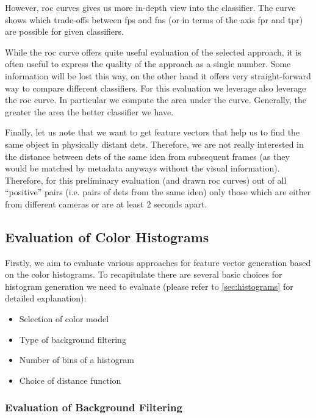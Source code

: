 However, \gls{roc} curves gives us more in-depth view into the classifier.
The curve shows which trade-offs between \glspl{fp} and \glspl{fn} (or in terms
of the axis \gls{fpr} and \gls{tpr}) are possible for given classifiers.

While the \gls{roc} curve offers quite useful evaluation of the
selected approach, it is often useful to express the quality of the
approach as a single number. Some information will be lost this way,
on the other hand it offers very straight-forward way to compare different
classifiers. For this evaluation we leverage also leverage the \gls{roc} curve.
In particular we compute the area under the curve. Generally, the greater
the area the better classifier we have.

Finally, let us note that we want to get feature vectors that help us to find the same object in physically distant \glspl{det}. Therefore, we are not really interested in the distance between \glspl{det} of the same \gls{iden} from subsequent frames (as they would be matched by metadata anyways without the visual information). Therefore, for this preliminary evaluation (and drawn \gls{roc} curves) out of all ``positive'' pairs (i.e. pairs of \glspl{det} from the same \gls{iden}) only those which are either from different cameras or are at least 2 seconds apart.

\subsection{Evaluation of Color Histograms}

Firstly, we aim to evaluate various approaches for feature vector generation
based on the color histograms. To recapitulate there are several basic choices
for histogram generation we need to evaluate (please refer to
\autoref{sec:histograms} for detailed explanation):

\begin{itemize}
    \item Selection of color model
    \item Type of background filtering
    \item Number of bins of a histogram
    \item Choice of distance function
\end{itemize}

\subsubsection{Evaluation of Background Filtering}

